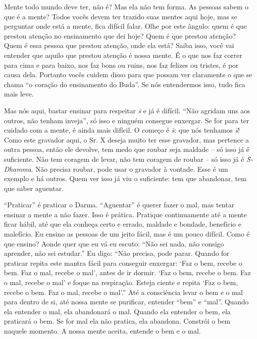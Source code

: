 Mente todo mundo deve ter, não é? Mas ela não tem forma. As pessoas
sabem o que é a mente? Todos vocês devem ter trazido suas mentes aqui
hoje, mas se perguntar onde está a mente, fica difícil falar. Olhe por
este ângulo: quem é que prestou atenção no ensinamento que dei hoje?
Quem é que prestou atenção? Quem é essa pessoa que prestou atenção,
onde ela está? Saiba isso, você vai entender que aquilo que prestou
atenção é nossa mente. É o que nos faz correr para cima e para baixo,
nos faz bons ou ruins, nos faz felizes ou tristes, é por causa dela.
Portanto vocês cuidem disso para que possam ver claramente o que se
chama “o coração do ensinamento do Buda”. Se nós entendermos isso, tudo
fica mais leve.

Mas nós aqui, bastar ensinar para respeitar \textit{s\=\ila} e já é
difícil. “Não agridam uns aos outros, não tenham inveja”, só isso e
ninguém consegue enxergar. Se for para ter cuidado com a mente, é ainda
mais difícil. O começo é \textit{s\=\ila}: que nós tenhamos
\textit{s\=\ila}! Como este gravador aqui, o Sr. X deseja muito ter
esse gravador, mas pertence a outra pessoa, então ele devolve, tem medo
que roubar seja maldade – só isso já é suficiente.
Não tem coragem de levar, não tem coragem de roubar
– só isso já é \textit{S\=\ila-Dhamma}. Não precisa
roubar, pode usar o gravador à vontade. Esse é um exemplo e há outros.
Quem ver isso já viu o suficiente: tem que abandonar, tem que saber
aguentar. 

“Praticar” é praticar o Darma. “Aguentar” é querer fazer o mal, mas
tentar ensinar a mente a não fazer. Isso é prática. Pratique
continuamente até a mente ficar hábil, até que ela conheça certo e
errado, maldade e bondade, benefício e malefício. Eu ensino as pessoas
de um jeito fácil, mas é um pouco difícil. Como é que ensino? Aonde
quer que eu vá eu escuto: “Não sei nada, não consigo aprender, não sei
estudar.” Eu digo: “Não precisa, pode parar. Quando for praticar repita
este mantra fácil para conseguir enxergar: ‘Faz o bem, recebe o bem.
Faz o mal, recebe o mal’, antes de ir dormir. ‘Faz o bem, recebe o bem.
Faz o mal, recebe o mal’ e foque na respiração. Esteja ciente e repita
‘Faz o bem, recebe o bem. Faz o mal, recebe o mal’.” Até a consciência
levar o bem e o mal para dentro de si, até nossa mente se purificar,
entender “bem” e “mal”. Quando ela entender o mal, ela abandonará o
mal. Quando ela entender o bem, ela praticará o bem. Se for mal ela não
pratica, ela abandona. Constrói o bem naquele momento. A nossa mente
aceita, entende o bem e o mal. 

